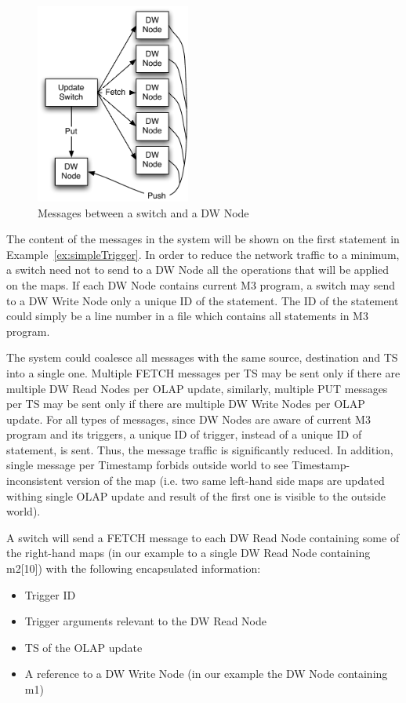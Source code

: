 \documentclass{sig-semester}
\def\OLAP{OLAP\xspace}
\def\M3{M3\xspace}
\begin{document}
\begin{figure}
\begin{center}
\includegraphics[width=2in]{graphics/UpdateStep.pdf}
\vspace{-3mm}
\caption{Messages between a switch and a DW Node}
\label{fig:msgs}
\vspace{-2mm}
\end{center}
\end{figure}

The content of the messages in the system will be shown on the first statement in Example~\ref{ex:simpleTrigger}. In order to reduce the network traffic to a minimum, a switch need not to send to a DW Node all the operations that will be applied on the maps. If each DW Node contains current \M3 program, a switch may send to a DW Write Node only a unique ID of the statement. The ID of the statement could simply be a line number in a file which contains all statements in \M3 program.

The system could coalesce all messages with the same source, destination and TS into a single one. Multiple FETCH messages per TS may be sent only if there are multiple DW Read Nodes per \OLAP update, similarly, multiple PUT messages per TS may be sent only if there are multiple DW Write Nodes per \OLAP update. For all types of messages, since DW Nodes are aware of current \M3 program and its triggers, a unique ID of trigger, instead of a unique ID of statement, is sent. Thus, the message traffic is significantly reduced. In addition, single message per Timestamp forbids outside world to see Timestamp-inconsistent version of the map (i.e. two same left-hand side maps are updated withing single \OLAP update and result of the first one is visible to the outside world).

A switch will send a FETCH message to each DW Read Node containing some of the right-hand maps (in our example to a single DW Read Node containing m2[10]) with the following encapsulated information:
\begin{itemize}
 \item Trigger ID
 \item Trigger arguments relevant to the DW Read Node
 \item TS of the \OLAP update
 \item A reference to a DW Write Node (in our example the DW Node containing m1)
\end{itemize}
\end{document}
